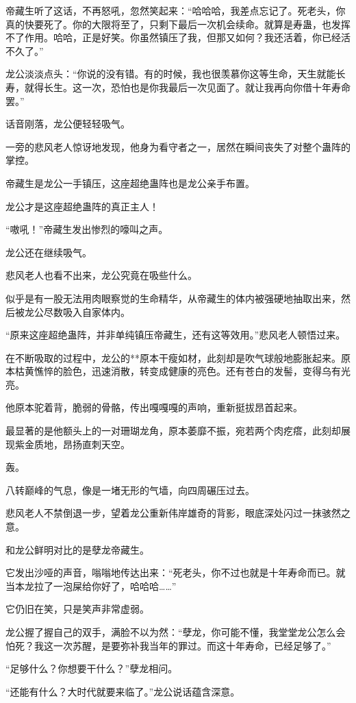 \begin{this_body}
帝藏生听了这话，不再怒吼，忽然笑起来：“哈哈哈，我差点忘记了。死老头，你真的快要死了。你的大限将至了，只剩下最后一次机会续命。就算是寿蛊，也发挥不了作用。哈哈，正是好笑。你虽然镇压了我，但那又如何？我还活着，你已经活不久了。”

龙公淡淡点头：“你说的没有错。有的时候，我也很羡慕你这等生命，天生就能长寿，就得长生。这一次，恐怕也是你我最后一次见面了。就让我再向你借十年寿命罢。”

话音刚落，龙公便轻轻吸气。

一旁的悲风老人惊讶地发现，他身为看守者之一，居然在瞬间丧失了对整个蛊阵的掌控。

帝藏生是龙公一手镇压，这座超绝蛊阵也是龙公亲手布置。

龙公才是这座超绝蛊阵的真正主人！

“嗷吼！”帝藏生发出惨烈的嚎叫之声。

龙公还在继续吸气。

悲风老人也看不出来，龙公究竟在吸些什么。

似乎是有一股无法用肉眼察觉的生命精华，从帝藏生的体内被强硬地抽取出来，然后被龙公尽数吸入自家体内。

“原来这座超绝蛊阵，并非单纯镇压帝藏生，还有这等效用。”悲风老人顿悟过来。

在不断吸取的过程中，龙公的**原本干瘦如材，此刻却是吹气球般地膨胀起来。原本枯黄憔悴的脸色，迅速消散，转变成健康的亮色。还有苍白的发髻，变得乌有光亮。

他原本驼着背，脆弱的骨骼，传出嘎嘎嘎的声响，重新挺拔昂首起来。

最显著的是他额头上的一对珊瑚龙角，原本萎靡不振，宛若两个肉疙瘩，此刻却展现紫金质地，昂扬直刺天空。

轰。

八转巅峰的气息，像是一堵无形的气墙，向四周碾压过去。

悲风老人不禁倒退一步，望着龙公重新伟岸雄奇的背影，眼底深处闪过一抹骇然之意。

和龙公鲜明对比的是孽龙帝藏生。

它发出沙哑的声音，嗡嗡地传达出来：“死老头，你不过也就是十年寿命而已。就当本龙拉了一泡屎给你好了，哈哈哈……”

它仍旧在笑，只是笑声非常虚弱。

龙公握了握自己的双手，满脸不以为然：“孽龙，你可能不懂，我堂堂龙公怎么会怕死？我这一次苏醒，是要弥补我当年的罪过。而这十年寿命，已经足够了。”

“足够什么？你想要干什么？”孽龙相问。

“还能有什么？大时代就要来临了。”龙公说话蕴含深意。


\end{this_body}
